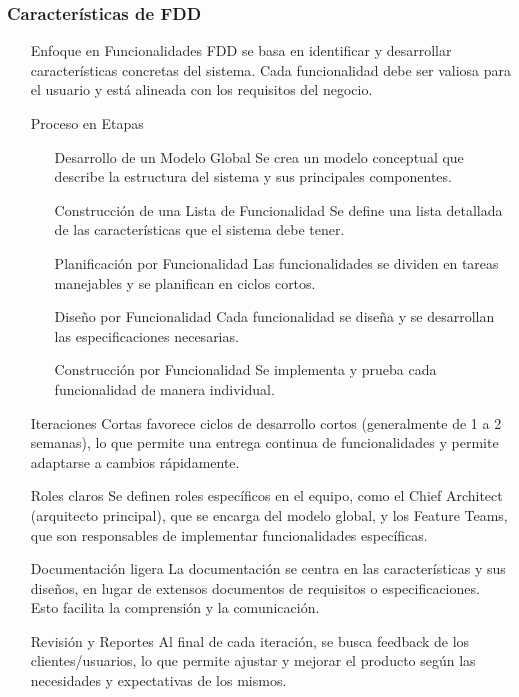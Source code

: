 \subsubsection{Características de FDD}
\begin{enumerate}
    \item [Enfoque en Funcionalidades]FDD se basa en identificar y desarrollar características concretas del sistema. Cada funcionalidad debe ser valiosa para el usuario y está alineada con los requisitos del negocio.
    \item [Proceso en Etapas]
        \begin{itemize}
            \item [Desarrollo de un Modelo Global]Se crea un modelo conceptual que describe la estructura del sistema y sus principales componentes.
            \item [Construcción de una Lista de Funcionalidad]Se define una lista detallada de las características que el sistema debe tener.
            \item [Planificación por Funcionalidad]Las funcionalidades se dividen en tareas manejables y se planifican en ciclos cortos.
            \item [Diseño por Funcionalidad]Cada funcionalidad se diseña y se desarrollan las especificaciones necesarias.
            \item [Construcción por Funcionalidad]Se implementa y prueba cada funcionalidad de manera individual.
        \end{itemize}
    \item [Iteraciones Cortas]favorece ciclos de desarrollo cortos (generalmente de 1 a 2 semanas), lo que permite una entrega continua de funcionalidades y permite adaptarse a cambios rápidamente.
    \item [Roles claros]Se definen roles específicos en el equipo, como el Chief Architect (arquitecto principal), que se encarga del modelo global, y los Feature Teams, que son responsables de implementar funcionalidades específicas.
    \item [Documentación ligera]La documentación se centra en las características y sus diseños, en lugar de extensos documentos de requisitos o especificaciones. Esto facilita la comprensión y la comunicación.
    \item [Revisión y Reportes]Al final de cada iteración, se busca feedback de los clientes/usuarios, lo que permite ajustar y mejorar el producto según las necesidades y expectativas de los mismos.
\end{enumerate}

